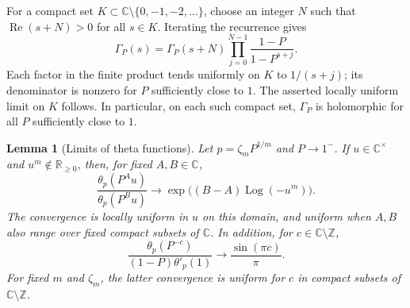 \documentclass[12pt]{amsart}
\newtheorem{lem}[thm]{Lemma}
\theoremstyle{definition}
\numberwithin{equation}{section}
\theoremstyle{definition}
\let\tht\theta
\let\ge\geqslant
\def\C{{\mathbb C}}
\def\Z{{\mathbb Z}}
\def\R{{\mathbb R}}
\def\beq{\begin{equation}}
\def\eeq{\end{equation}}
\begin{document}
For a compact set $K\subset\C\setminus\{0,-1,-2,\ldots\}$,
choose an integer $N$ such that $\operatorname{Re}(s+N)>0$
for all $s\in K$. Iterating the recurrence gives
\[
 \Gamma_P(s)=\Gamma_P(s+N)
       \prod_{j=0}^{N-1}\frac{1-P}{1-P^{s+j}}.
\]
Each factor in the finite product tends uniformly on $K$
to $1/(s+j)$; its denominator is nonzero for $P$
sufficiently close to $1$. The asserted locally uniform
limit on $K$ follows. In particular, on each such compact set,
$\Gamma_P$ is holomorphic for all $P$ sufficiently close to $1$.

\begin{lem}[Limits of theta functions]
\label{lem:hyp-theta-limits}
Let $p=\zeta_mP^{1/m}$ and $P\to1^-$.  If
$u\in\C^\times$ and $u^m\notin\R_{\ge0}$, then, for
fixed $A,B\in\C$,
\beq\label{eq:hyp-limit-theta-ratio}
 \frac{\tht_p(P^A u)}{\tht_p(P^B u)}
 \longrightarrow
 \exp\bigl((B-A)\operatorname{Log}(-u^m)\bigr).
\eeq
The convergence is locally uniform in $u$ on this domain,
and uniform when $A,B$ also range over fixed
compact subsets of $\C$.  In addition, for $c\in\C\setminus\Z$,
\beq\label{eq:hyp-limit-theta-derivative}
 \frac{\tht_p(P^{-c})}{(1-P)\tht'_p(1)}
 \longrightarrow\frac{\sin(\pi c)}{\pi}.
\eeq
For fixed $m$ and $\zeta_m$, the latter convergence is
uniform for $c$ in compact subsets of $\C\setminus\Z$.
\end{lem}
\end{document}
